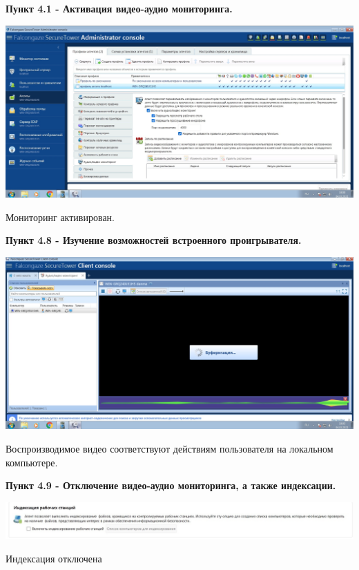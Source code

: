 \documentclass[a4paper,14pt]{extarticle}
\begin{document}
    \newpage
    \textbf{Пункт 4.1 -  Активация видео-аудио мониторинга.} 
    \begin{center}
        \includegraphics[scale=0.25]{pics/4.1.jpg}

        Мониторинг активирован.
    \end{center}

    \textbf{Пункт 4.8 - Изучение возможностей встроенного проигрывателя.}
    \begin{center}
        \includegraphics[scale=0.25]{pics/4.8.jpg}

        Воспроизводимое видео соответствуют действиям пользователя на
локальном компьютере.
    \end{center}

    \textbf{Пункт 4.9 - Отключение видео-аудио мониторинга, а также индексации.} 
    \begin{center}
        \includegraphics[scale=0.3]{pics/4.9.jpg}

         Индексация отключена 
    \end{center}
\end{document}
